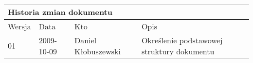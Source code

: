 \paragraph{}

\begin{tabular}{|p{1.5cm}|p{2cm}|p{3.5cm}|p{7cm}|}
	\hline
	\multicolumn{4}{|l|}{Historia zmian dokumentu} \\
	\hline
	Wersja & Data & Kto & Opis \\
	\hline
	01 & 2009-10-09 & Daniel Kłobuszewski &
	Określenie podstawowej struktury dokumentu \\
	\hline
\end{tabular}

\newpage
